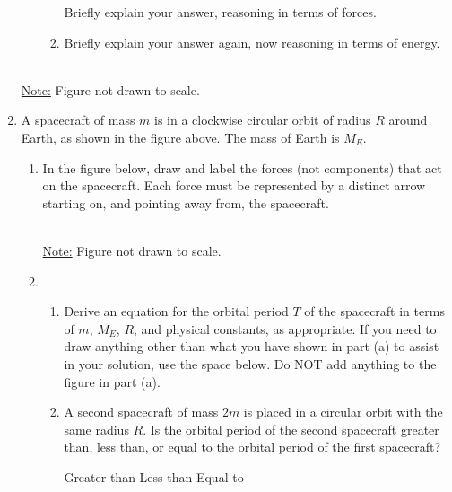 \documentclass{../../../oss-classkick}
\begin{document}
\begin{enumerate}
\begin{enumerate}
\begin{enumerate}
      \vspace{.1in}Briefly explain your answer, reasoning in terms of forces.
      
    \item Briefly explain your answer again, now reasoning in terms of energy.
    \end{enumerate}
  \end{enumerate}

  \newpage
  
  \begin{center}
    \\
    \underline{Note:} Figure not drawn to scale.
  \end{center}
\item A spacecraft of mass $m$ is in a clockwise circular orbit of radius $R$
  around Earth, as shown in the figure above. The mass of Earth is $M_E$.
  \begin{enumerate}
  \item In the figure below, draw and label the forces (not components) that
    act on the spacecraft. Each force must be represented by a distinct arrow
    starting on, and pointing away from, the spacecraft.
    \begin{center}
      \\
      \underline{Note:} Figure not drawn to scale.
  \end{center}

  \item
    \begin{enumerate}
    \item Derive an equation for the orbital period $T$ of the spacecraft in
      terms of $m$, $M_E$, $R$, and physical constants, as appropriate. If you
      need to draw anything other than what you have shown in part (a) to
      assist in your solution, use the space below. Do NOT add anything to the
      figure in part (a).
    \item A second spacecraft of mass $2m$ is placed in a circular orbit with
      the same radius $R$. Is the orbital period of the second spacecraft
      greater than, less than, or equal to the orbital period of the first
      spacecraft?

      \vspace{.1in}
      \underline{\hspace{.3in}}Greater than\hspace{.2in}
      \underline{\hspace{.3in}}Less than\hspace{.2in}
      \underline{\hspace{.3in}}Equal to
      

\end{enumerate}
\end{enumerate}
\end{enumerate}
\end{document}
